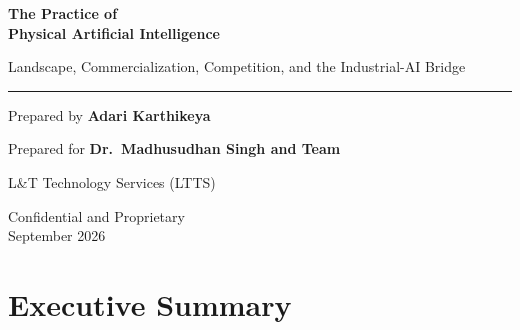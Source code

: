 \documentclass[11pt,a4paper]{article}
\begin{document}
\begin{titlepage}
\thispagestyle{empty}
\begin{center}
\vspace*{4.5cm}

{\Huge\bfseries\color{textdark} The Practice of\\[0.35em] Physical Artificial Intelligence}

\vspace{0.6cm}
{\large\color{textgray} Landscape, Commercialization, Competition, and the Industrial-AI Bridge}

\vspace{1.2cm}
\rule{6cm}{0.6pt}
\vspace{1.2cm}

{\large\color{textdark} Prepared by \textbf{Adari Karthikeya}}

\vspace{0.4cm}
{\normalsize\color{textgray} Prepared for \textbf{Dr.\ Madhusudhan Singh and Team}}

\vspace{0.2cm}
{\small\color{textgray} L\&T Technology Services (LTTS)}

\vfill

{\small\color{footergray} Confidential and Proprietary}\\[0.3em]
{\small\color{footergray} September 2026}

\vspace*{1.0cm}
\end{center}
\end{titlepage}

\newpage
\thispagestyle{plain}
\tableofcontents
\newpage

\section*{Executive Summary}
\end{document}
